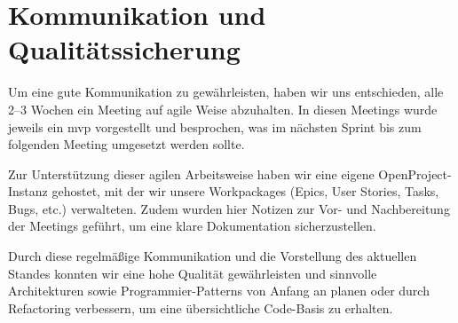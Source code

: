 \chapter{Kommunikation und Qualitätssicherung} \label{ch:kommunikation}
Um eine gute Kommunikation zu gewährleisten, haben wir uns entschieden, alle 2–3 Wochen ein Meeting auf agile Weise abzuhalten. 
In diesen Meetings wurde jeweils ein \gls{mvp} vorgestellt und besprochen, was im nächsten Sprint bis zum folgenden Meeting umgesetzt werden sollte.

Zur Unterstützung dieser agilen Arbeitsweise haben wir eine eigene OpenProject-Instanz gehostet, mit der wir unsere Workpackages (Epics, User Stories, Tasks, Bugs, etc.) verwalteten. 
Zudem wurden hier Notizen zur Vor- und Nachbereitung der Meetings geführt, um eine klare Dokumentation sicherzustellen.

Durch diese regelmäßige Kommunikation und die Vorstellung des aktuellen Standes konnten wir eine hohe Qualität gewährleisten und sinnvolle Architekturen sowie Programmier-Patterns von Anfang an planen oder durch Refactoring verbessern, um eine übersichtliche Code-Basis zu erhalten.
